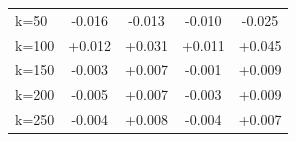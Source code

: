 \begin{tabular}{lcccc}
\hspace*{1em}k=50 & -0.016 & -0.013 & -0.010 & -0.025 \\
\hspace*{1em}k=100 & +0.012 & +0.031 & +0.011 & +0.045 \\
\hspace*{1em}k=150 & -0.003 & +0.007 & -0.001 & +0.009 \\
\hspace*{1em}k=200 & -0.005 & +0.007 & -0.003 & +0.009 \\
\hspace*{1em}k=250 & -0.004 & +0.008 & -0.004 & +0.007 \\
\bottomrule
\end{tabular}
